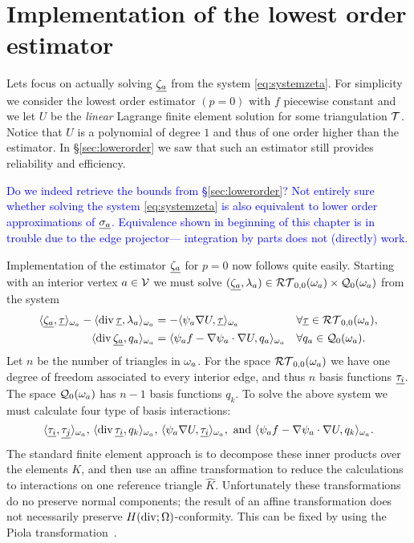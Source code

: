 \documentclass[thesis.tex]{subfiles}
\begin{document}
\section{Implementation of the lowest order estimator}
Lets focus on actually solving $\underline{\zeta_a}$ from the system \eqref{eq:systemzeta}. 
For simplicity we consider the lowest order estimator $(p=0)$ with $f$ piecewise constant and 
we let $U$ be the \emph{linear} Lagrange finite element solution for some triangulation $\mathcal{T}$. 
Notice that $U$ is a polynomial of degree $1$ and thus of one order higher than the estimator.
In \S\ref{sec:lowerorder} we saw that such an estimator still provides reliability and efficiency.

\textcolor{blue}{Do we indeed retrieve the bounds from \S\ref{sec:lowerorder}? Not entirely sure whether solving the system \eqref{eq:systemzeta} is also equivalent to lower 
order approximations of $\underline{\sigma_a}$. Equivalence shown in beginning of this chapter is in trouble due to the edge projector--- integration by parts does not (directly) work.}

Implementation of the estimator $\underline{\zeta_a}$ for $p=0$ now follows quite easily. 
Starting with an interior vertex $a \in \mathcal{V}$ we must solve $(\underline{\zeta_a}, \lambda_a) \in \mathcal{RT}_{0,0}(\omega_a)\times \mathcal{Q}_0(\omega_a)$ from the system
\begin{equation}
  \label{eq:systemp0}
  \begin{alignedat}{3}
    \langle \underline{\zeta_a}, \underline{\tau} \rangle_{\omega_a} - \langle \operatorname{div} \underline{\tau}, {\lambda_a} \rangle_{\omega_a} &= - \langle \psi_a \nabla U, \underline{\tau} \rangle_{\omega_a} && \quad \forall \underline{\tau} \in \mathcal{RT}_{0,0}(\omega_a),\\
    \langle \operatorname{div} \underline{\zeta_a}, q_a \rangle_{\omega_a} &= \langle \psi_a f - \nabla \psi_a \cdot \nabla U, q_a \rangle_{\omega_a} && \quad \forall q_a \in \mathcal{Q}_0(\omega_a).
  \end{alignedat}
\end{equation}
  Let $n$ be the number of triangles in $\omega_a$.
  For the space $\mathcal{RT}_{0,0}(\omega_a)$ we have one degree of freedom associated to every interior edge, and thus $n$ basis functions $\underline{\tau_i}$. The space $\mathcal{Q}_0(\omega_a)$ has $n-1$ basis functions $q_k$.  To solve the above system we must calculate four type of basis interactions:
  \begin{equation}
    \label{eq:basinact}
    \langle \underline{\tau_i}, \underline{\tau_j} \rangle_{\omega_a}, \, \langle \operatorname{div} \underline{\tau_i}, q_k \rangle_{\omega_a}, \, \langle \psi_a \nabla U, \underline{\tau_i} \rangle_{\omega_a}, \text{ and } \langle \psi_a f - \nabla \psi_a \cdot \nabla U, q_k \rangle_{\omega_a}.
  \end{equation}
  The standard finite element approach is to decompose these inner products over the elements $K$, and then use an affine transformation
  to reduce the calculations to interactions on one reference triangle $\hat K$. Unfortunately these transformations do no preserve
  normal components; the result of an affine transformation does not necessarily preserve $H(\operatorname{div}; \Omega)$-conformity. This can be fixed 
  by using the Piola transformation~\cite[\S2.1.3]{brezzimixed}. 
  
\end{document}
